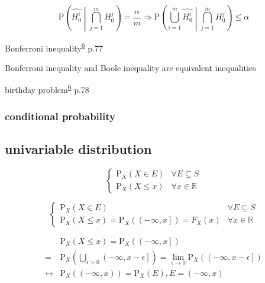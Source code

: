 \documentclass[
]{book}
\theoremstyle{definition}
\theoremstyle{definition}
\theoremstyle{definition}
\theoremstyle{definition}
\theoremstyle{remark}
\begin{document}
\[
\mathrm{P}\left(\overbrace{H_{{\scriptscriptstyle 0}}^{{\scriptscriptstyle i}}}\middle|\bigcap\limits _{j=1}^{m}H_{{\scriptscriptstyle 0}}^{{\scriptscriptstyle j}}\right)=\dfrac{\alpha}{m}\Rightarrow\mathrm{P}\left(\bigcup\limits _{i=1}^{m}\overbrace{H_{{\scriptscriptstyle 0}}^{{\scriptscriptstyle i}}}\middle|\bigcap\limits _{j=1}^{m}H_{{\scriptscriptstyle 0}}^{{\scriptscriptstyle j}}\right)\le\alpha
\]

Bonferroni inequality\textsuperscript{\protect\hyperlink{ref-zhang2021}{6}} p.77

Bonferroni inequality and Boole inequality are equivalent inequalities

birthday problem\textsuperscript{\protect\hyperlink{ref-zhang2021}{6}} p.78

\hypertarget{conditional-probability}{%
\subsubsection{conditional probability}\label{conditional-probability}}

\hypertarget{univariable-distribution}{%
\subsection{univariable distribution}\label{univariable-distribution}}

\[
\begin{cases}
\mathrm{P}_{{\scriptscriptstyle X}}\left(X\in E\right) & \forall E\subseteq S\\
\mathrm{P}_{{\scriptscriptstyle X}}\left(X\le x\right) & \forall x\in\mathbb{R}
\end{cases}
\]

\[
\begin{cases}
\mathrm{P}_{{\scriptscriptstyle X}}\left(X\in E\right) & \forall E\subseteq S\\
\mathrm{P}_{{\scriptscriptstyle X}}\left(X\le x\right)=\mathrm{P}_{{\scriptscriptstyle X}}\left(\left(-\infty,x\right]\right)=F_{{\scriptscriptstyle X}}\left(x\right) & \forall x\in\mathbb{R}
\end{cases}
\]

\[
\begin{aligned}
 & \mathrm{P}_{{\scriptscriptstyle X}}\left(X\le x\right)=\mathrm{P}_{{\scriptscriptstyle X}}\left(\left(-\infty,x\right]\right)\\
= & \mathrm{P}_{{\scriptscriptstyle X}}\left(\bigcup\limits _{\epsilon>0}\left(-\infty,x-\epsilon\right]\right)=\lim_{\epsilon\rightarrow0}\mathrm{P}_{{\scriptscriptstyle X}}\left(\left(-\infty,x-\epsilon\right]\right)\\
\leftrightarrow & \mathrm{P}_{{\scriptscriptstyle X}}\left(\left(-\infty,x\right)\right)=\mathrm{P}_{{\scriptscriptstyle X}}\left(E\right),E=\left(-\infty,x\right)
\end{aligned}
\]
\end{document}
